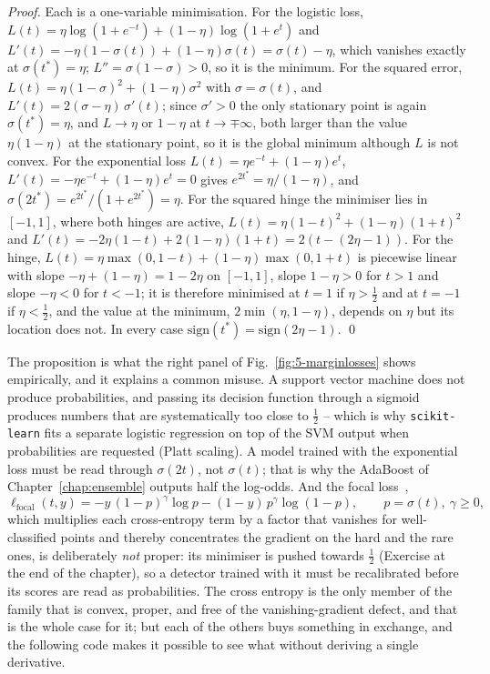 \begin{proof}
Each is a one-variable minimisation.  For the logistic loss,
$L(t)=\eta\log(1+e^{-t})+(1-\eta)\log(1+e^{t})$ and
$L'(t)=-\eta(1-\sigma(t))+(1-\eta)\sigma(t)=\sigma(t)-\eta$, which vanishes
exactly at $\sigma(t^{*})=\eta$; $L''=\sigma(1-\sigma)>0$, so it is the
minimum.  For the squared error,
$L(t)=\eta(1-\sigma)^{2}+(1-\eta)\sigma^{2}$ with $\sigma=\sigma(t)$, and
$L'(t)=2(\sigma-\eta)\,\sigma'(t)$; since $\sigma'>0$ the only stationary
point is again $\sigma(t^{*})=\eta$, and $L\to\eta$ or $1-\eta$ at
$t\to\mp\infty$, both larger than the value $\eta(1-\eta)$ at the stationary
point, so it is the global minimum although $L$ is not convex.  For the
exponential loss $L(t)=\eta e^{-t}+(1-\eta)e^{t}$, $L'(t)=-\eta e^{-t}
+(1-\eta)e^{t}=0$ gives $e^{2t^{*}}=\eta/(1-\eta)$, and
$\sigma(2t^{*})=e^{2t^{*}}/(1+e^{2t^{*}})=\eta$.  For the squared hinge the
minimiser lies in $[-1,1]$, where both hinges are active,
$L(t)=\eta(1-t)^{2}+(1-\eta)(1+t)^{2}$ and $L'(t)=-2\eta(1-t)+2(1-\eta)(1+t)
=2(t-(2\eta-1))$.  For the hinge, $L(t)=\eta\max(0,1-t)+(1-\eta)\max(0,1+t)$
is piecewise linear with slope $-\eta+(1-\eta)=1-2\eta$ on $[-1,1]$, slope
$1-\eta>0$ for $t>1$ and slope $-\eta<0$ for $t<-1$; it is therefore
minimised at $t=1$ if $\eta>\tfrac12$ and at $t=-1$ if $\eta<\tfrac12$, and
the value at the minimum, $2\min(\eta,1-\eta)$, depends on $\eta$ but its
location does not.  In every case $\mathrm{sign}(t^{*})=\mathrm{sign}(2\eta-1)$.
\qed
\end{proof}

The proposition is what the right panel of Fig.~\ref{fig:5-marginlosses}
shows empirically, and it explains a common misuse.  A support vector machine
does not produce probabilities, and passing its decision function through a
sigmoid produces numbers that are systematically too close to $\tfrac12$ --
which is why \texttt{scikit-learn} fits a separate logistic regression on top
of the SVM output when probabilities are requested (Platt scaling).  A model
trained with the exponential loss must be read through $\sigma(2t)$, not
$\sigma(t)$; that is why the AdaBoost of Chapter~\ref{chap:ensemble} outputs
half the log-odds.  And the focal loss~\cite{lin2017},
\begin{equation}
  \ell_{\mathrm{focal}}(t,y)
   = -y\,(1-p)^{\gamma}\log p - (1-y)\,p^{\gamma}\log(1-p),
  \qquad p=\sigma(t),\ \gamma\ge0,
  \label{eq:5-focal}
\end{equation}
which multiplies each cross-entropy term by a factor that vanishes for
well-classified points and thereby concentrates the gradient on the hard and
the rare ones, is deliberately \emph{not} proper: its minimiser is pushed
towards $\tfrac12$ (Exercise at the end of the chapter), so a detector trained
with it must be recalibrated before its scores are read as probabilities.
The cross entropy is the only member of the family that is convex, proper,
and free of the vanishing-gradient defect, and that is the whole case for it;
but each of the others buys something in exchange, and the following code
makes it possible to see what without deriving a single derivative.

